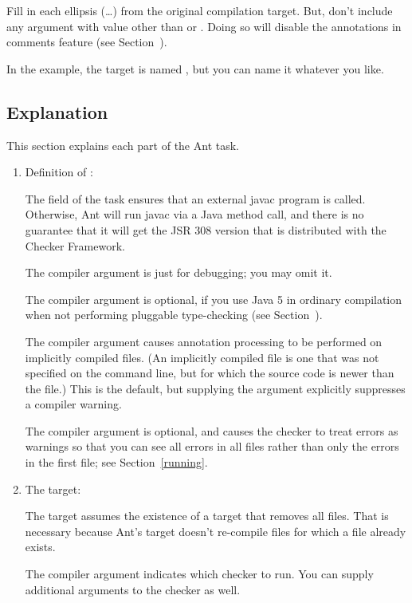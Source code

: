\begin{enumerate}
Fill in each ellipsis (\ldots) from the original compilation target.  But,
don't include any  argument with value other than 
or .  Doing so will disable the annotations in
comments feature (see Section~).

In the example, the target is named , but you can
name it whatever you like.
\end{enumerate}

\subsection{Explanation\label{ant-task-explanation}}

This section explains each part of the Ant task.

\begin{enumerate}
\item Definition of :

The  field of the  task
ensures that an external javac program is called.  Otherwise, Ant will run
javac via a Java method call, and there is no guarantee that it will get
the JSR 308 version that is distributed with the Checker Framework.

The  compiler argument is just for debugging; you may omit
it.

The  compiler argument is optional, if you use Java 5 in
ordinary compilation when not performing pluggable type-checking (see
Section~).

The  compiler argument causes annotation processing
to be performed on implicitly compiled files.  (An implicitly compiled file
is one that was not specified on the command line, but for which the source
code is newer than the  file.)  This is the default, but
supplying the argument explicitly suppresses a compiler warning.

The  compiler argument is optional, and causes the checker to
treat errors as warnings so that you can see all errors in all files rather
than only the errors in the first file; see Section~\ref{running}.

\item The  target:

The target assumes the existence of a  target that removes all
 files.  That is necessary because Ant's  target
doesn't re-compile  files for which a  file
already exists.

The  compiler argument indicates which checker to
run.  You can supply additional arguments to the checker as well.

\end{enumerate}


